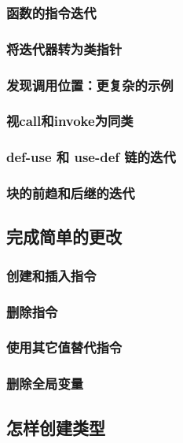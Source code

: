 \documentclass[12pt,a4paper]{article}
\begin{document}
\subsubsection{函数的指令迭代}

\subsubsection{将迭代器转为类指针}

\subsubsection{发现调用位置：更复杂的示例}

\subsubsection{视call和invoke为同类}

\subsubsection{def-use 和 use-def 链的迭代}

\subsubsection{块的前趋和后继的迭代}

\subsection{完成简单的更改}

\subsubsection{创建和插入指令}

\subsubsection{删除指令}

\subsubsection{使用其它值替代指令}

\subsubsection{删除全局变量}

\subsection{怎样创建类型}
\end{document}
